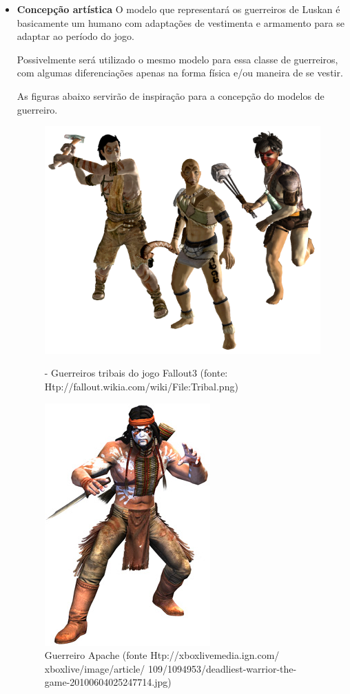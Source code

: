 \begin{itemize}
\item{\bf Concepção artística}
O modelo que representará os guerreiros de Luskan é basicamente um humano com adaptações de vestimenta e armamento para se adaptar ao período do jogo.

Possivelmente será utilizado o mesmo modelo para essa classe de guerreiros, com algumas diferenciações apenas na forma física e/ou maneira de se vestir.

As figuras abaixo servirão de inspiração para a concepção do modelos de guerreiro.
\newpage
 \begin{figure}[H]
 \centering
 \includegraphics[scale=0.5]{Imagens/guerreiro01.png}
 \caption{- Guerreiros tribais do jogo Fallout3 (fonte: Htp://fallout.wikia.com/wiki/File:Tribal.png)}
\label{img:guerreiro01}
 \centering
 \includegraphics[scale=0.5]{Imagens/guerreiro02.png}
 \caption{Guerreiro Apache (fonte Htp://xboxlivemedia.ign.com/
 xboxlive/image/article/
 109/1094953/deadliest-warrior-the-game-20100604025247714.jpg)}
\end{figure}
\end{itemize}

